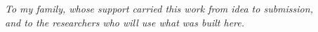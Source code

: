 \thispagestyle{empty}
\vspace*{6cm}
\begin{center}
\textit{To my family, whose support carried this work from idea to submission,\\
and to the researchers who will use what was built here.}
\end{center}
\vfill
\clearpage
